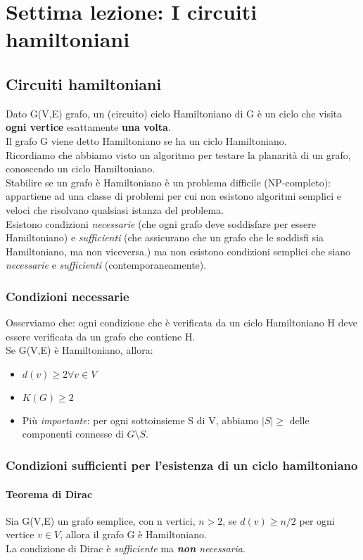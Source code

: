 \section{Settima lezione: I circuiti hamiltoniani}
\subsection{Circuiti hamiltoniani}
Dato G(V,E) grafo, un (circuito) ciclo Hamiltoniano di G è un ciclo che visita \textbf{ogni vertice} esattamente
\textbf{una volta}. \\
Il grafo G viene detto Hamiltoniano se ha un ciclo Hamiltoniano. \\
Ricordiamo che abbiamo visto un algoritmo per testare la planarità di un grafo, conoscendo un ciclo
Hamiltoniano. \\
Stabilire se un grafo è Hamiltoniano è un problema difficile (NP-completo): appartiene ad una classe di
problemi per cui non esistono algoritmi semplici e veloci che risolvano qualsiasi istanza del problema. \\
Esistono condizioni \emph{necessarie} (che ogni grafo deve soddisfare per essere Hamiltoniano) e \emph{sufficienti} (che assicurano che un grafo che le soddisfi sia Hamiltoniano, ma non viceversa.) ma non esistono condizioni semplici che siano \emph{necessarie} e \emph{sufficienti} (contemporaneamente).

\subsubsection{Condizioni necessarie}
Osserviamo che: ogni condizione che è verificata da un ciclo Hamiltoniano H deve essere verificata da un grafo
che contiene H. \\
Se G(V,E) è Hamiltoniano, allora:
\begin{itemize}
    \item \(d(v) \geq 2  \forall v \in V\)
    \item \(K(G) \geq 2 \)
    \item Più \emph{importante}: per ogni sottoinsieme S di V, abbiamo \( |S| \geq \) delle componenti connesse di \(G \setminus S\).
\end{itemize}

\subsubsection{Condizioni sufficienti per l'esistenza di un ciclo hamiltoniano}
\paragraph{Teorema di Dirac} Sia G(V,E) un grafo semplice, con n vertici, \(n>2\), se \(d(v) \geq n/2\) per ogni vertice \(v \in V\), allora il grafo G è Hamiltoniano. \\
La condizione di Dirac è \emph{sufficiente} ma \emph{\textbf{non} necessaria}.

